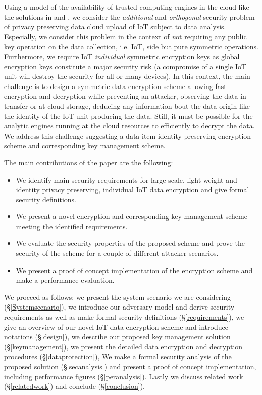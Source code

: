 {Using a model of the availability of trusted computing engines in the cloud like the solutions in \cite{Zheng2017} and \cite{Schuster2015}, we consider the \textit {additional} and \textit{orthogonal} security problem of privacy preserving data cloud upload of IoT subject to data analysis. Especially, we consider this problem in the context of {\textit not} requiring any public key operation on the data collection, i.e. IoT, side but pure symmetric operations. Furthermore, we require IoT  \textit{individual} symmetric encryption keys as global encryption keys constitute a major security risk (a compromise of a single IoT unit will destroy the security for all or many devices).  In this context, the main challenge is to design a symmetric data encryption scheme allowing fast encryption and decryption while preventing an attacker, observing the data in transfer or at cloud storage, deducing any information bout the data origin like the identity of the IoT unit producing the data. Still, it must be possible for the analytic engines running at the cloud resources to efficiently to decrypt the data. We address this challenge suggesting a data item identity preserving encryption scheme and corresponding key management scheme.

The main contributions of the paper are the following:
\begin{itemize}
    \item We identify main security requirements for large scale, light-weight and identity privacy preserving, individual IoT data encryption and give formal security definitions.
    \item We present a novel encryption and corresponding key management scheme meeting the identified requirements.
    \item We evaluate the security properties of the proposed scheme and prove the security of the scheme for a couple of different attacker scenarios.
    \item We present a proof of concept implementation of the encryption scheme and make a performance evaluation.
\end{itemize}

We proceed as follows: we present the system scenario we are considering (\S \ref{Systemscenario}), we introduce our adversary model and derive security requirements as well as make formal security definitions (\S \ref{requirements}),  we give an overview of our novel IoT data encryption scheme and introduce notations (\S \ref{design}), we describe our proposed key management solution (\S \ref{keymanagement}), we present the detailed data encryption and decryption procedures (\S \ref{dataprotection}),  We make a formal security analysis of the proposed solution (\S \ref{secanalysis}) and present a proof of concept implementation, including performance figures (\S \ref{peranalysis}). Lastly we discuss related work (\S \ref{relatedwork}) and conclude (\S \ref{conclusion}).


}
